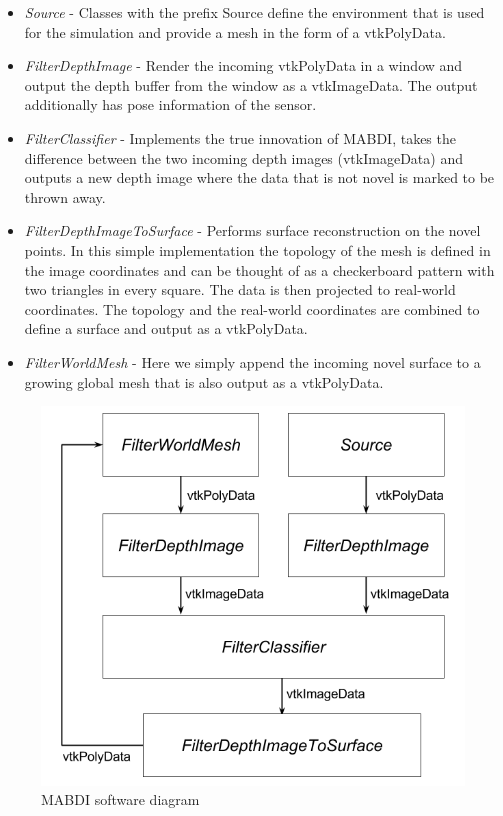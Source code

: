 \begin{itemize}
    \item  \textit{Source} - Classes with the prefix Source define the
    environment that is used for the simulation and provide a mesh in the form
    of a vtkPolyData.
    \item \textit{FilterDepthImage} - Render the incoming vtkPolyData in a
    window and output the depth buffer from the window as a vtkImageData. The
    output additionally has pose information of the sensor.
    \item \textit{FilterClassifier} - Implements the true innovation of MABDI,
    takes the difference between the two incoming depth images (vtkImageData)
    and outputs a new depth image where the data that is not novel is marked to
    be thrown away.
    \item \textit{FilterDepthImageToSurface} - Performs surface reconstruction
    on the novel points. In this simple implementation the topology of the mesh
    is defined in the image coordinates and can be thought of as a checkerboard
    pattern with two triangles in every square. The data is then projected to
    real-world coordinates. The topology and the real-world coordinates are
    combined to define a surface and output as a vtkPolyData.
    \item \textit{FilterWorldMesh} - Here we simply append the incoming novel
    surface to a growing global mesh that is also output as a vtkPolyData.
\end{itemize}

\begin{figure}[h]%
\centering
\includegraphics[width=.75\textwidth]{figures/diagram_software.png}
\caption{MABDI software diagram}
\label{fig:software}
\end{figure}
